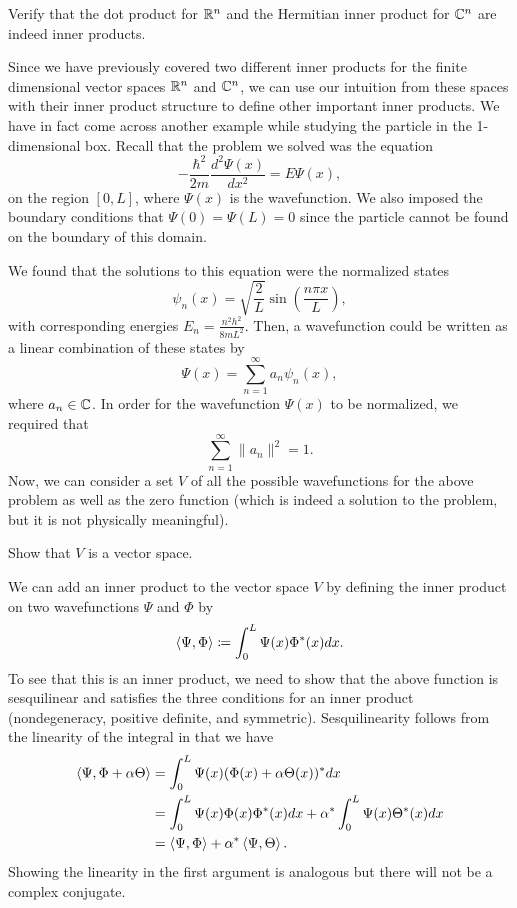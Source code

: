 \begin{exercise}
	Verify that the dot product for $\mathbb{R}^n$ and the Hermitian inner product for $\mathbb{C}^n$ are indeed inner products.
\end{exercise}

Since we have previously covered two different inner products for the finite dimensional vector spaces $\mathbb{R}^n$ and $\mathbb{C}^n$, we can use our intuition from these spaces with their inner product structure to define other important inner products.  We have in fact come across another example while studying the particle in the 1-dimensional box.  Recall that the problem we solved was the equation
\[
-\frac{\hbar^2}{2m} \frac{d^2 \Psi(x)}{dx^2} = E\Psi(x),
\]
on the region $[0,L]$, where $\Psi(x)$ is the wavefunction.  We also imposed the boundary conditions that $\Psi(0)=\Psi(L)=0$ since the particle cannot be found on the boundary of this domain.  

We found that the solutions to this equation were the normalized states 
\[
\psi_n(x) = \sqrt{\frac{2}{L}} \sin\left(\frac{n\pi x}{L}\right),
\]
with corresponding energies $E_n = \frac{n^2h^2}{8mL^2}$. Then, a wavefunction could be written as a linear combination of these states by
\[
\Psi(x) = \sum_{n=1}^\infty a_n \psi_n(x),
\]
where $a_n \in \mathbb{C}$.  In order for the wavefunction $\Psi(x)$ to be normalized, we required that
\[
\sum_{n=1}^\infty \|a_n\|^2=1.
\]
Now, we can consider a set $V$ of all the possible wavefunctions for the above problem as well as the zero function (which is indeed a solution to the problem, but it is not physically meaningful).

\begin{exercise}
	Show that $V$ is a vector space. 
\end{exercise}

We can add an inner product to the vector space $V$ by defining the inner product on two wavefunctions $\Psi$ and $\Phi$ by
\[
\left\langle \Psi, \Phi \right\rangle \coloneqq \int_0^L \Psi(x) \Phi^*(x)dx.
\]
To see that this is an inner product, we need to show that the above function is sesquilinear and satisfies the three conditions for an inner product (nondegeneracy, positive definite, and symmetric).  Sesquilinearity follows from the linearity of the integral in that we have
\begin{align*}
	\left\langle \Psi, \Phi+\alpha \Theta \right\rangle &= \int_0^L \Psi(x)(\Phi(x)+\alpha \Theta(x))^*dx \\
	&= \int_0^L \Psi(x) \Phi(x)\Phi^*(x)dx+\alpha^* \int_0^L \Psi(x) \Theta^*(x)dx\\
	&= \left\langle \Psi, \Phi \right\rangle+\alpha^* \left\langle \Psi, \Theta \right\rangle.
\end{align*}
Showing the linearity in the first argument is analogous but there will not be a complex conjugate.  

